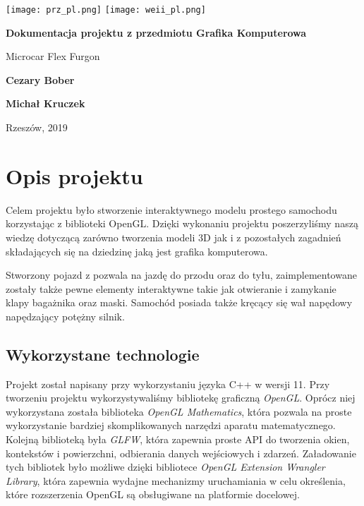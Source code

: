 \documentclass[a4paper,12pt]{article}
\numberwithin{equation}{section}
\begin{document}

\begin{titlepage}
    \texttt{[image: prz\_pl.png]}
    \hfill
    \texttt{[image: weii\_pl.png]}
    
    \centering
    \vfill
    
    {\Huge \textbf{Dokumentacja projektu z przedmiotu Grafika Komputerowa} \par}
	\vspace{1.5cm}
	{\LARGE Microcar Flex Furgon \par}
	
	\vfill
    
    {\Large \textbf{Cezary Bober} \par}
    {\Large \textbf{Michał Kruczek} \par}
    
    \vfill
    
    {\LARGE Rzeszów, 2019\par}
\end{titlepage}

\setlength{\parskip}{0.3cm}
\setlength{\parindent}{1cm}
\setcounter{page}{2}

\tableofcontents
\pagebreak

\section{Opis projektu}
Celem projektu było stworzenie interaktywnego modelu prostego samochodu korzystając z biblioteki OpenGL. Dzięki wykonaniu projektu poszerzyliśmy naszą wiedzę dotyczącą zarówno tworzenia modeli 3D jak i z pozostałych zagadnień składających się na dziedzinę jaką jest grafika komputerowa. 

Stworzony pojazd z pozwala na jazdę do przodu oraz do tyłu, zaimplementowane zostały także pewne elementy interaktywne takie jak otwieranie i zamykanie klapy bagażnika oraz maski. Samochód posiada także kręcący się wał napędowy napędzający potężny silnik.

\subsection{Wykorzystane technologie}
Projekt został napisany przy wykorzystaniu języka C++ w wersji 11. Przy tworzeniu projektu wykorzystywaliśmy bibliotekę graficzną \textit{OpenGL}. Oprócz niej wykorzystana została biblioteka \textit{OpenGL Mathematics}, która pozwala na proste wykorzystanie bardziej skomplikowanych narzędzi aparatu matematycznego. Kolejną biblioteką była \textit{GLFW}, która zapewnia proste API do tworzenia okien, kontekstów i powierzchni, odbierania danych wejściowych i zdarzeń. Załadowanie tych bibliotek było możliwe dzięki bibliotece \textit{OpenGL Extension Wrangler Library}, która zapewnia wydajne mechanizmy uruchamiania w celu określenia, które rozszerzenia OpenGL są obsługiwane na platformie docelowej.
\end{document}

